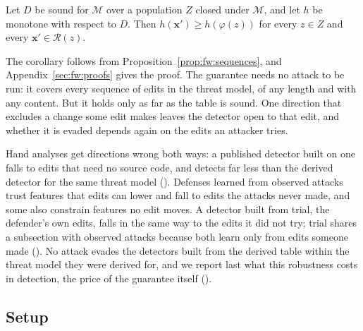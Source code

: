 \corollary[Robustness]
\label{cor:fw:robustness}
{
Let $D$ be sound for $\mathcal{M}$ over a population $Z$ closed under $\mathcal{M}$, and let $h$ be monotone with
respect to $D$. Then $h(\mathbf{x}') \ge h(\varphi(z))$ for every $z \in Z$ and every $\mathbf{x}' \in \mathcal{R}(z)$.
}

\noindent The corollary follows from Proposition~\ref{prop:fw:sequences}, and Appendix~\ref{sec:fw:proofs} gives the
proof. The guarantee needs no attack to be run: it covers every sequence of edits in the threat model, of any length
and with any content. But it holds only as far as the table is sound. One direction that excludes a change some edit
makes leaves the detector open to that edit, and whether it is evaded depends again on the edits an attacker tries.

Hand analyses get directions wrong both ways: a published detector built on one falls to edits that need no source
code, and detects far less than the derived detector for the same threat model (). Defenses
learned from observed attacks trust features that edits can lower and fall to edits the attacks never made, and some
also constrain features no edit moves. A detector built from trial, the defender's own edits, falls in the same way to
the edits it did not try; trial shares a subsection with observed attacks because both learn only from edits someone
made (). No attack evades the detectors built from the derived table within the threat model
they were derived for, and we report last what this robustness costs in detection, the price of the guarantee itself
().

\subsection{Setup}
\label{sec:eval:setup}


